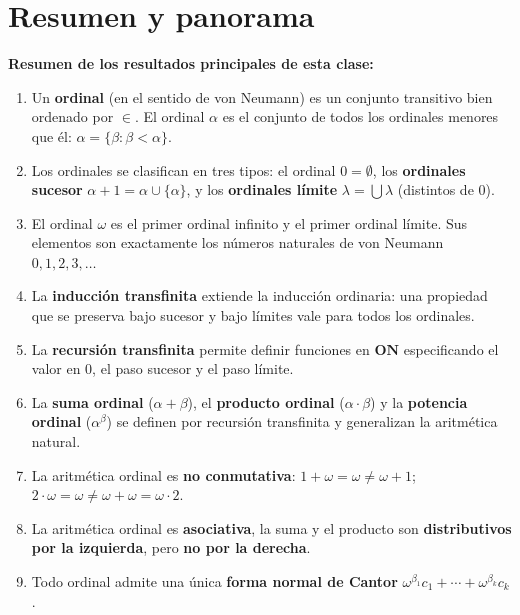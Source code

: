 \section{Resumen y panorama}

\begin{importante}
\textbf{Resumen de los resultados principales de esta clase:}
\begin{enumerate}[leftmargin=2em, label=\textbf{\arabic*.}]
  \item Un \textbf{ordinal} (en el sentido de von Neumann) es un conjunto transitivo bien ordenado por $\in$. El ordinal $\alpha$ es el conjunto de todos los ordinales menores que él: $\alpha = \{\beta : \beta < \alpha\}$.
  \item Los ordinales se clasifican en tres tipos: el ordinal $0 = \emptyset$, los \textbf{ordinales sucesor} $\alpha + 1 = \alpha \cup \{\alpha\}$, y los \textbf{ordinales límite} $\lambda = \bigcup \lambda$ (distintos de 0).
  \item El ordinal $\omega$ es el primer ordinal infinito y el primer ordinal límite. Sus elementos son exactamente los números naturales de von Neumann $0, 1, 2, 3, \ldots$
  \item La \textbf{inducción transfinita} extiende la inducción ordinaria: una propiedad que se preserva bajo sucesor y bajo límites vale para todos los ordinales.
  \item La \textbf{recursión transfinita} permite definir funciones en $\mathbf{ON}$ especificando el valor en $0$, el paso sucesor y el paso límite.
  \item La \textbf{suma ordinal} ($\alpha + \beta$), el \textbf{producto ordinal} ($\alpha \cdot \beta$) y la \textbf{potencia ordinal} ($\alpha^\beta$) se definen por recursión transfinita y generalizan la aritmética natural.
  \item La aritmética ordinal es \textbf{no conmutativa}: $1 + \omega = \omega \neq \omega + 1$; $2 \cdot \omega = \omega \neq \omega + \omega = \omega \cdot 2$.
  \item La aritmética ordinal es \textbf{asociativa}, la suma y el producto son \textbf{distributivos por la izquierda}, pero \textbf{no por la derecha}.
  \item Todo ordinal admite una única \textbf{forma normal de Cantor} $\omega^{\beta_1}c_1 + \cdots + \omega^{\beta_k}c_k$.
\end{enumerate}
\end{importante}

